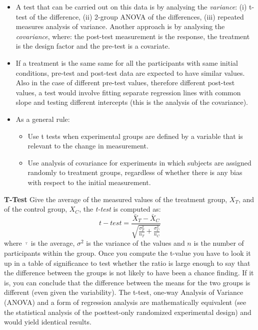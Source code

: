 \documentclass[hidelinks,11pt,a4paper]{report}
\begin{document}
\begin{itemize}
\item A test that can be carried out on this data is by analysing the \emph{variance}: (i) t-test of the difference, (ii) 2-group ANOVA of the differences, (iii) repeated measures analysis of variance. Another approach is by analysing the \emph{covariance}, where: the post-test measurement is the response, the treatment is the design factor and the pre-test is a covariate.
\item If a treatment is the same same for all the participants with same initial conditions, pre-test and post-test data are expected to have similar values. Also in the case of different pre-test values, therefore different post-test values, a test would involve fitting separate regression lines with common slope and testing different intercepts (this is the analysis of the covariance).
\item As a general rule:
	\begin{itemize}
	\item Use t tests when experimental groups are defined by a variable that is relevant to the change in measurement.
	\item Use analysis of covariance for experiments in which subjects are assigned randomly to treatment groups, regardless of whether there is any bias with respect to the initial measurement.
	\end{itemize}
\end{itemize}

\noindent \textbf{T-Test}
Give the average of the measured values of the treatment group, $X_T$, and of the control group, $X_C$, the \emph{t-test} is computed as:
\begin{equation}
t-test = \frac{\bar{X}_T - \bar{X}_C}{\sqrt{\frac{\sigma_T^2}{n_T} + \frac{\sigma_C^2}{n_C} }}
\end{equation}
where $\bar{\cdot}$ is the average, $\sigma^2$ is the variance of the values and $n$ is the number of participants within the group. Once you compute the t-value you have to look it up in a table of significance to test whether the ratio is large enough to say that the difference between the groups is not likely to have been a chance finding. If it is, you can conclude that the difference between the means for the two groups is different (even given the variability). The t-test, one-way Analysis of Variance (ANOVA) and a form of regression analysis are mathematically equivalent (see the statistical analysis of the posttest-only randomized experimental design) and would yield identical results.
\end{document}

